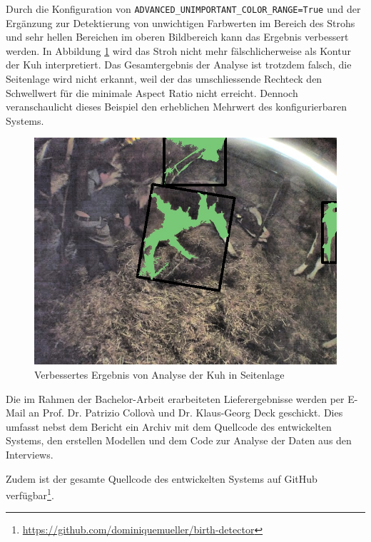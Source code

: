 Durch die Konfiguration von \texttt{ADVANCED_UNIMPORTANT_COLOR_RANGE=True} und der Ergänzung zur Detektierung von unwichtigen Farbwerten im Bereich des Strohs und sehr hellen Bereichen im oberen Bildbereich kann das Ergebnis verbessert werden. In Abbildung \ref{fig: Verbessertes Ergebnis von Analyse der Kuh in Seitenlage} wird das Stroh nicht mehr fälschlicherweise als Kontur der Kuh interpretiert. Das Gesamtergebnis der Analyse ist trotzdem falsch, die Seitenlage wird nicht erkannt, weil der das umschliessende Rechteck den Schwellwert für die minimale Aspect Ratio nicht erreicht. Dennoch veranschaulicht dieses Beispiel den erheblichen Mehrwert des konfigurierbaren Systems.

\begin{figure}[H]
	\center
	\includegraphics[scale=0.1]{Grafiken/resultate/verbessertesResultat.jpg}
	\caption{Verbessertes Ergebnis von Analyse der Kuh in Seitenlage} 
	\label{fig: Verbessertes Ergebnis von Analyse der Kuh in Seitenlage} 
\end{figure}


Die im Rahmen der Bachelor-Arbeit erarbeiteten Lieferergebnisse werden per E-Mail an Prof. Dr. Patrizio Collovà und Dr. Klaus-Georg Deck geschickt. Dies umfasst nebst dem Bericht ein Archiv mit dem Quellcode des entwickelten Systems, den erstellen Modellen und dem Code zur Analyse der Daten aus den Interviews. 

Zudem ist der gesamte Quellcode des entwickelten Systems auf GitHub verfügbar\footnote{\url{https://github.com/dominiquemueller/birth-detector}}. 